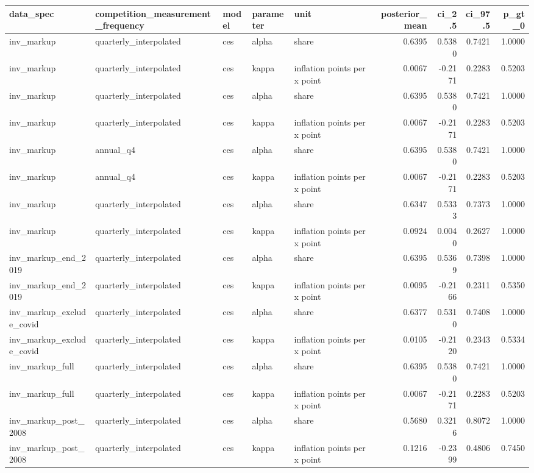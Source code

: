 \begin{tabular}{lllllrrrr}
\toprule
data\_spec & competition\_measurement\_frequency & model & parameter & unit & posterior\_mean & ci\_2.5 & ci\_97.5 & p\_gt\_0 \\
\midrule
inv\_markup & quarterly\_interpolated & ces & alpha & share & 0.6395 & 0.5380 & 0.7421 & 1.0000 \\
inv\_markup & quarterly\_interpolated & ces & kappa & inflation points per x point & 0.0067 & -0.2171 & 0.2283 & 0.5203 \\
inv\_markup & quarterly\_interpolated & ces & alpha & share & 0.6395 & 0.5380 & 0.7421 & 1.0000 \\
inv\_markup & quarterly\_interpolated & ces & kappa & inflation points per x point & 0.0067 & -0.2171 & 0.2283 & 0.5203 \\
inv\_markup & annual\_q4 & ces & alpha & share & 0.6395 & 0.5380 & 0.7421 & 1.0000 \\
inv\_markup & annual\_q4 & ces & kappa & inflation points per x point & 0.0067 & -0.2171 & 0.2283 & 0.5203 \\
inv\_markup & quarterly\_interpolated & ces & alpha & share & 0.6347 & 0.5333 & 0.7373 & 1.0000 \\
inv\_markup & quarterly\_interpolated & ces & kappa & inflation points per x point & 0.0924 & 0.0040 & 0.2627 & 1.0000 \\
inv\_markup\_end\_2019 & quarterly\_interpolated & ces & alpha & share & 0.6395 & 0.5369 & 0.7398 & 1.0000 \\
inv\_markup\_end\_2019 & quarterly\_interpolated & ces & kappa & inflation points per x point & 0.0095 & -0.2166 & 0.2311 & 0.5350 \\
inv\_markup\_exclude\_covid & quarterly\_interpolated & ces & alpha & share & 0.6377 & 0.5310 & 0.7408 & 1.0000 \\
inv\_markup\_exclude\_covid & quarterly\_interpolated & ces & kappa & inflation points per x point & 0.0105 & -0.2120 & 0.2343 & 0.5334 \\
inv\_markup\_full & quarterly\_interpolated & ces & alpha & share & 0.6395 & 0.5380 & 0.7421 & 1.0000 \\
inv\_markup\_full & quarterly\_interpolated & ces & kappa & inflation points per x point & 0.0067 & -0.2171 & 0.2283 & 0.5203 \\
inv\_markup\_post\_2008 & quarterly\_interpolated & ces & alpha & share & 0.5680 & 0.3216 & 0.8072 & 1.0000 \\
inv\_markup\_post\_2008 & quarterly\_interpolated & ces & kappa & inflation points per x point & 0.1216 & -0.2399 & 0.4806 & 0.7450 \\

\end{tabular}
